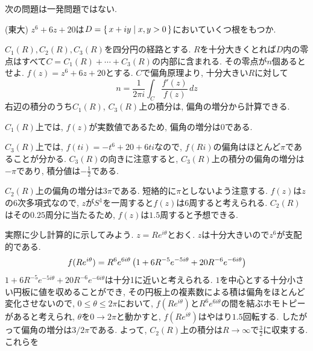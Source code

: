 次の問題は一発問題ではない.
\begin{egprob} (東大)
$z^6+6z+20$は$D=\set{x+iy \mid x,y>0}$においていくつ根をもつか.
\end{egprob}
\begin{egans}
$C_1(R), C_2(R), C_3(R)$を四分円の経路とする. $R$を十分大きくとれば$D$内の零点はすべて$C=C_1(R)+\cdots + C_3(R)$の内部に含まれる. その零点が$n$個あるとせよ. $f(z) = z^6 + 6z + 20$とする.  $C$で偏角原理より, 十分大きい$R$に対して
\[n = \dfrac{1}{2\pi i} \int_{C} \dfrac{f'(z)}{f(z)}\, dz\]
右辺の積分のうち$C_1(R)$, $C_3(R)$上の積分は, 偏角の増分から計算できる. \par
$C_1(R)$上では, $f(z)$が実数値であるため, 偏角の増分は0である. \par
$C_3(R)$上では, $f(ti) = -t^6 + 20 + 6ti$なので, $f(Ri)$の偏角はほとんど$\pi$であることが分かる. $C_3(R)$の向きに注意すると, $C_3(R)$上の積分の偏角の増分は$-\pi$であり, 積分値は$-\frac{1}{2}$である.  \par
$C_2(R)$上の偏角の増分は$3\pi$である. 短絡的に$\pi$としないよう注意する. $f(z)$は$z$の6次多項式なので, $z$が$S^1$を一周すると$f(z)$は6周すると考えられる. $C_2(R)$はその$0.25$周分に当たるため, $f(z)$は$1.5$周すると予想できる. \par
実際に少し計算的に示してみよう. $z=Re^{i\theta}$とおく. $z$は十分大きいので$z^6$が支配的である.
\[f(Re^{i\theta}) = R^6e^{6i\theta}\left( 1 + 6R^{-5}e^{-5i\theta} + 20R^{-6}e^{-6i\theta} \right) \]
$1+6R^{-5}e^{-5i\theta} + 20R^{-6}e^{-6i\theta}$は十分1に近いと考えられる. $1$を中心とする十分小さい円板に値を収めることができ, その円板上の複素数による積は偏角をほとんど変化させないので, $0\leq \theta\leq 2\pi$において, $f(Re^{i\theta})$と$R^6e^{6i\theta}$の間を結ぶホモトピーがあると考えられ,  $\theta$を$0\to 2\pi$と動かすと, $f(Re^{i\theta}) $はやはり$1.5$回転する. したがって偏角の増分は$3/2\pi$である. よって, $C_2(R)$上の積分は$R\to \infty$で$\frac{3}{2}$に収束する. これらを
\end{egans}




